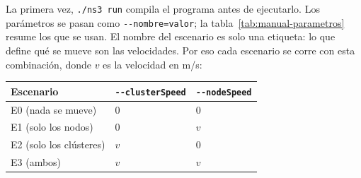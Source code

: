 La primera vez, \texttt{./ns3 run} compila el programa antes de ejecutarlo. Los
parámetros se pasan como \texttt{-{}-nombre=valor}; la tabla~\ref{tab:manual-parametros}
resume los que se usan. El nombre del escenario es solo una etiqueta: lo que define qué
se mueve son las velocidades. Por eso cada escenario se corre con esta combinación,
donde $v$ es la velocidad en m/s:

\begin{center}
\small
\begin{tabular}{lll}
\toprule
\textbf{Escenario} & \texttt{-{}-clusterSpeed} & \texttt{-{}-nodeSpeed} \\
\midrule
E0 (nada se mueve) & 0 & 0 \\
E1 (solo los nodos) & 0 & $v$ \\
E2 (solo los clústeres) & $v$ & 0 \\
E3 (ambos) & $v$ & $v$ \\
\bottomrule
\end{tabular}
\end{center}

